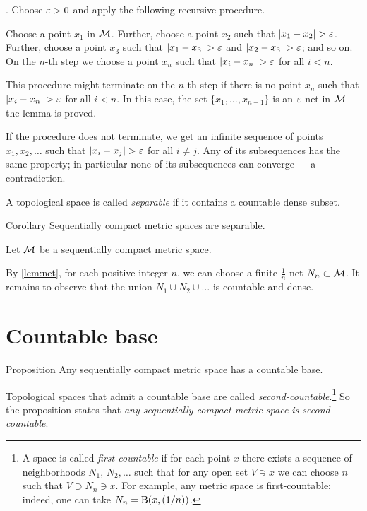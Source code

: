 .
Choose $\varepsilon>0$ and apply the following recursive procedure.

Choose a point $x_1$ in $\mathcal{M}$.
Further, choose a point $x_2$ such that $|x_1\z-x_2|>\eps$.
Further, choose a point $x_3$ such that $|x_1\z-x_3|>\eps$ and $|x_2\z-x_3|>\eps$; and so on.
On the $n$-th step we choose a point $x_n$ such that $|x_i\z-x_n|>\eps$ for all $i<n$.

This procedure might terminate on the $n$-th step if there is no point $x_n$ such that $|x_i\z-x_n|>\eps$ for all $i<n$.
In this case, the set $\{x_1,\ldots,x_{n-1}\}$ is an $\varepsilon$-net in $\mathcal{M}$ --- the lemma is proved.

If the procedure does not terminate, we get an infinite sequence of points $x_1,x_2,\ldots$ such that $|x_i-x_j|>\eps$ for all $i\ne j$.
Any of its subsequences has the same property; in particular none of its subsequences can converge --- a contradiction.
\qeds

A topological space is called \emph{separable} if it contains a countable dense subset.

\begin{thm}{Corollary}\label{cor:comp>separable}
Sequentially compact metric spaces are separable.
\end{thm}

Let $\mathcal{M}$ be a sequentially compact metric space.

By \ref{lem:net}, for each positive integer $n$,
we can choose a finite $\tfrac1n$-net $N_n\subset\mathcal{M}$.
It remains to observe that the union $N_1\cup N_2\cup \ldots$ is countable and dense.
\qeds

\section{Countable base}\label{sec:countable-base}

\begin{thm}{Proposition}\label{cor:comp>2count}
Any sequentially compact metric space has a countable base.
\end{thm}

Topological spaces that admit a countable base are called \emph{second-countable}.\footnote{A space is called \emph{first-countable} if for each point $x$ there exists a sequence of neighborhoods $N_1$, $N_2,\ldots$ such that for any open set $V\ni x$ we can choose $n$ such that $V\supset N_n\ni x$. For example, any metric space is first-countable; indeed, one can take $N_n=\mathrm{B}(x,(1/n))$.}
So the proposition states that \textit{any sequentially compact metric space is second-countable}.

